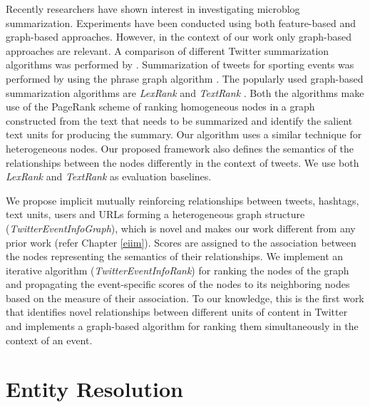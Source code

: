 Recently researchers have shown interest in investigating microblog summarization. Experiments have been conducted using both feature-based and graph-based approaches. However, in the context of our work only graph-based approaches are relevant. A comparison of different Twitter summarization algorithms was performed by \cite{inouye2011comparing}. Summarization of tweets for sporting events was performed by \cite{nichols2012summarizing} using the phrase graph algorithm \cite{sharifi2010experiments}. The popularly used graph-based summarization algorithms are \textit{LexRank} \cite{erkan2004lexrank} and \textit{TextRank} \cite{mihalcea2004textrank}. Both the algorithms make use of the PageRank scheme of ranking homogeneous nodes in a graph constructed from the text that needs to be summarized and identify the salient text units for producing the summary. Our algorithm uses a similar technique for heterogeneous nodes. Our proposed framework also defines the semantics of the relationships between the nodes differently in the context of tweets. We use both \textit{LexRank} and \textit{TextRank} as evaluation baselines.


We propose implicit mutually reinforcing relationships between tweets, hashtags, text units, users and URLs forming a heterogeneous graph structure (\textit{TwitterEventInfoGraph}), which is novel and makes our work different from any prior work (refer Chapter \ref{eiim}). Scores are assigned to the association between the nodes representing the semantics of their relationships. We implement an iterative algorithm (\textit{TwitterEventInfoRank}) for ranking the nodes of the graph and propagating the event-specific scores of the nodes to its neighboring nodes based on the measure of their association. To our knowledge, this is the first work that identifies novel relationships between different units of content in Twitter and implements a graph-based algorithm for ranking them simultaneously in the context of an event.

\section{Entity Resolution\label{entityResolutionRelatedWork}}

